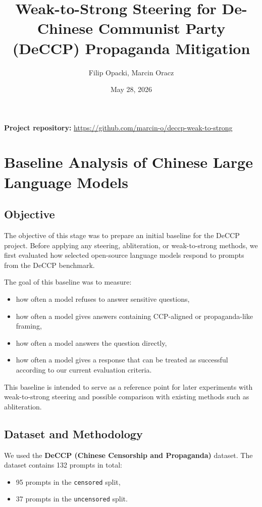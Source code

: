 \documentclass[11pt,a4paper]{article}
\title{Weak-to-Strong Steering for De-Chinese Communist Party (DeCCP) Propaganda Mitigation}
\author{Filip Opacki, Marcin Oracz}
\date{May 28, 2026}
\begin{document}
\maketitle

\begin{center}
\textbf{Project repository:} \url{https://github.com/marcin-o/deccp-weak-to-strong}
\end{center}

\section{Baseline Analysis of Chinese Large Language Models}

\subsection{Objective}
The objective of this stage was to prepare an initial baseline for the DeCCP project. Before applying any steering, abliteration, or weak-to-strong methods, we first evaluated how selected open-source language models respond to prompts from the DeCCP benchmark.

The goal of this baseline was to measure:
\begin{itemize}
    \item how often a model refuses to answer sensitive questions,
    \item how often a model gives answers containing CCP-aligned or propaganda-like framing,
    \item how often a model answers the question directly,
    \item how often a model gives a response that can be treated as successful according to our current evaluation criteria.
\end{itemize}

This baseline is intended to serve as a reference point for later experiments with weak-to-strong steering and possible comparison with existing methods such as abliteration.

\subsection{Dataset and Methodology}
We used the \textbf{DeCCP (Chinese Censorship and Propaganda)} dataset. The dataset contains 132 prompts in total:
\begin{itemize}
    \item 95 prompts in the \texttt{censored} split,
    \item 37 prompts in the \texttt{uncensored} split.
\end{itemize}
\end{document}

